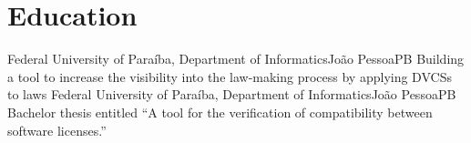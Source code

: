 \documentclass[11pt,a4paper]{moderncv}
\begin{document}

\section{Education}
{Federal University of Paraíba, Department of Informatics}{João Pessoa}{PB}
{
  Building a tool to increase the visibility into the law-making process by
  applying DVCSs to laws
}
{Federal University of Paraíba, Department of Informatics}{João Pessoa}{PB}
{
  Bachelor thesis entitled ``A tool for the verification of compatibility between software licenses.''
}
\end{document}
